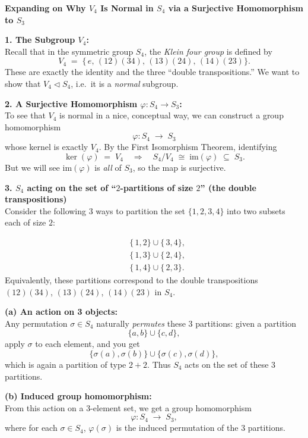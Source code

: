 \documentclass[12pt]{article}
\theoremstyle{definition} %
\theoremstyle{plain} %
\begin{document}
\noindent
\textbf{Expanding on Why $V_4$ Is Normal in $S_4$ via a Surjective Homomorphism to $S_3$}

\bigskip

\noindent
\textbf{1. The Subgroup $V_4$:}\\
Recall that in the symmetric group $S_4$, the \emph{Klein four group} is defined by
\[
V_4 \;=\; \{\, e,\,(12)(34),\,(13)(24),\,(14)(23)\}.
\]
These are exactly the identity and the three “double transpositions.” We want to show that $V_4 \triangleleft S_4$, i.e.\ it is a \emph{normal} subgroup. 

\bigskip

\noindent
\textbf{2. A Surjective Homomorphism $\varphi: S_4 \to S_3$:}\\
To see that $V_4$ is normal in a nice, conceptual way, we can construct a group homomorphism
\[
\varphi : S_4 \;\longrightarrow\; S_3
\]
whose kernel is exactly $V_4$. By the First Isomorphism Theorem, identifying
\[
\ker(\varphi) \;=\; V_4
\quad\Longrightarrow\quad
S_4 / V_4 \;\cong\; \mathrm{im}(\varphi) \;\subseteq\; S_3.
\]
But we will see $\mathrm{im}(\varphi)$ is \emph{all} of $S_3$, so the map is surjective.

\bigskip

\noindent
\textbf{3. $S_4$ acting on the set of “$2$-partitions of size $2$” (the double transpositions)}\\
Consider the following 3 ways to partition the set $\{1,2,3,4\}$ into two subsets each of size $2$:

\[
\begin{aligned}
&\{\,1,2\} \cup \{\,3,4\}, \\
&\{\,1,3\} \cup \{\,2,4\}, \\
&\{\,1,4\} \cup \{\,2,3\}.
\end{aligned}
\]
Equivalently, these partitions correspond to the double transpositions $(12)(34)$, $(13)(24)$, $(14)(23)$ in $S_4$. 

\bigskip

\noindent
\textbf{(a) An action on 3 objects:}\\
Any permutation $\sigma \in S_4$ naturally \emph{permutes} these 3 partitions: given a partition 
\[
\{a,b\}\cup\{c,d\},
\]
apply $\sigma$ to each element, and you get
\[
\{\sigma(a), \sigma(b)\} \cup \{\sigma(c), \sigma(d)\},
\]
which is again a partition of type $2+2$. Thus $S_4$ acts on the set of these 3 partitions. 

\bigskip

\noindent
\textbf{(b) Induced group homomorphism:}\\
From this action on a 3-element set, we get a group homomorphism
\[
\varphi : S_4 \;\longrightarrow\; S_3,
\]
where for each $\sigma \in S_4$, $\varphi(\sigma)$ is the induced permutation of the 3 partitions.
\end{document}
